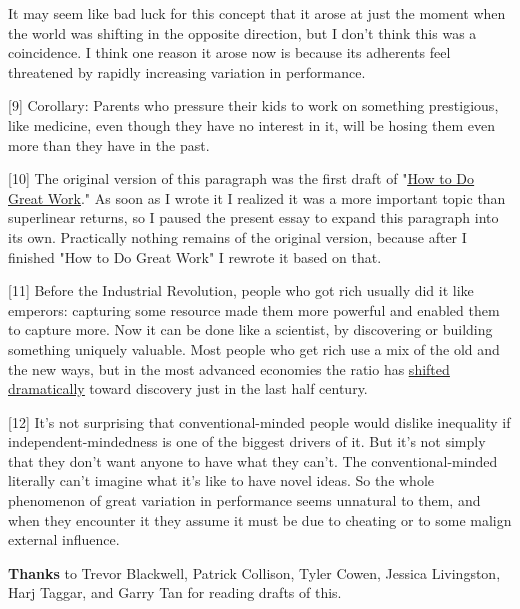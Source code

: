 It may seem like
                  bad luck for this concept that it arose at just the moment
                  when the world was shifting in the opposite direction, but I
                  don't think this was a coincidence. I think one reason it
                  arose now is because its adherents feel threatened by rapidly
                  increasing variation in performance.

[9] Corollary: Parents who pressure their kids to work on
                  something prestigious, like medicine, even though they have no
                  interest in it, will be hosing them even more than they have
                  in the past.

[10] The original version of this paragraph was the first draft
                  of "\href{http://www.paulgraham.com/greatwork.html}{\underline{How to Do Great Work}}." As soon as I wrote it I realized it was a more important
                  topic than superlinear returns, so I paused the present essay
                  to expand this paragraph into its own. Practically nothing
                  remains of the original version, because after I finished "How
                  to Do Great Work" I rewrote it based on that.

[11] Before the Industrial Revolution, people who got rich
                  usually did it like emperors: capturing some resource made
                  them more powerful and enabled them to capture more. Now it
                  can be done like a scientist, by discovering or building
                  something uniquely valuable. Most people who get rich use a
                  mix of the old and the new ways, but in the most advanced
                  economies the ratio has
                  \href{http://www.paulgraham.com/richnow.html}{\underline{shifted dramatically}} toward
                  discovery just in the last half century.

[12] It's not surprising that conventional-minded people would
                  dislike inequality if independent-mindedness is one of the
                  biggest drivers of it. But it's not simply that they don't
                  want anyone to have what they can't. The conventional-minded
                  literally can't imagine what it's like to have novel ideas. So
                  the whole phenomenon of great variation in performance seems
                  unnatural to them, and when they encounter it they assume it
                  must be due to cheating or to some malign external
                  influence.



\textbf{Thanks} to Trevor Blackwell, Patrick Collison, Tyler
                    Cowen, Jessica Livingston, Harj Taggar, and Garry Tan for
                    reading drafts of this.


              
            
          
            
              
                


                  
              
            
          
